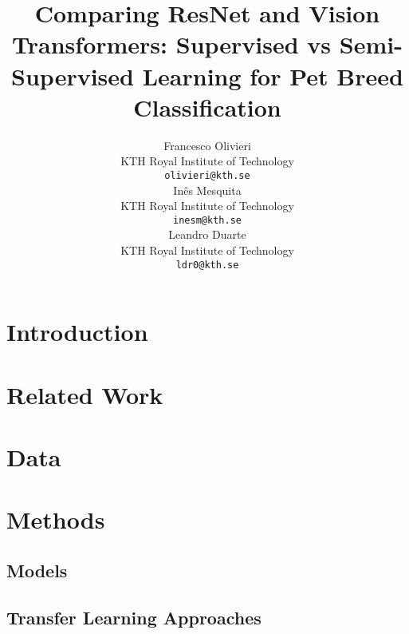 \documentclass{article}
\title{Comparing ResNet and Vision Transformers: Supervised vs Semi-Supervised Learning for Pet Breed Classification}
\author{%
  Francesco Olivieri \\
  KTH Royal Institute of Technology \\
  \texttt{olivieri@kth.se} \\
  \And
  Inês Mesquita \\
  KTH Royal Institute of Technology \\
  \texttt{inesm@kth.se} \\
  \And
  Leandro Duarte \\
  KTH Royal Institute of Technology \\
  \texttt{ldr0@kth.se} \\
}
\begin{document}
\maketitle


\begin{abstract}
\end{abstract}


\section{Introduction}


\section{Related Work}


\section{Data}


\section{Methods}


\subsection{Models}


\subsection{Transfer Learning Approaches}
\end{document}
